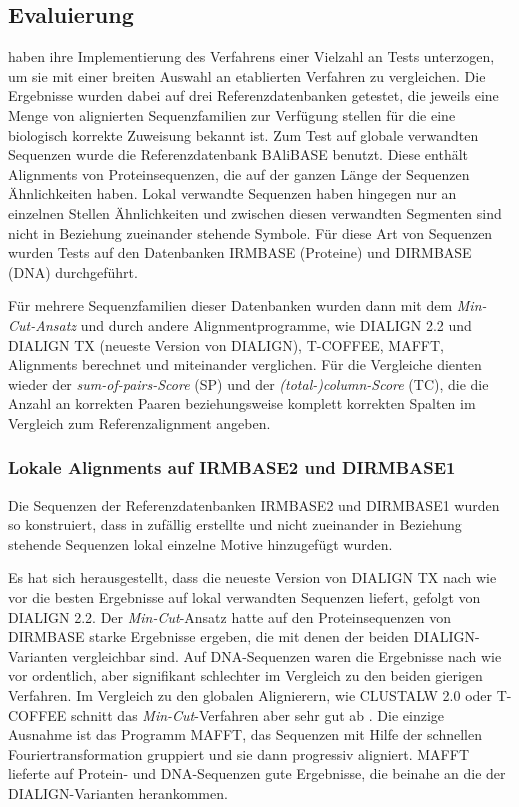 \subsection{Evaluierung}

\cite{cpm10} haben ihre Implementierung des Verfahrens einer Vielzahl an Tests unterzogen, um sie mit einer breiten Auswahl an etablierten Verfahren zu vergleichen. Die Ergebnisse wurden dabei auf drei Referenzdatenbanken getestet, die jeweils eine Menge von alignierten Sequenzfamilien zur Verfügung stellen für die eine biologisch korrekte Zuweisung bekannt ist. Zum Test auf globale verwandten Sequenzen wurde die Referenzdatenbank BAliBASE benutzt. Diese enthält Alignments von Proteinsequenzen, die auf der ganzen Länge der Sequenzen Ähnlichkeiten haben. Lokal verwandte Sequenzen haben hingegen nur an einzelnen Stellen Ähnlichkeiten und zwischen diesen verwandten Segmenten sind nicht in Beziehung zueinander stehende Symbole. Für diese Art von Sequenzen wurden Tests auf den Datenbanken IRMBASE (Proteine) und DIRMBASE (DNA) durchgeführt.

Für mehrere Sequenzfamilien dieser Datenbanken wurden dann mit dem \emph{Min-Cut-Ansatz} und durch andere Alignmentprogramme, wie DIALIGN 2.2 und DIALIGN TX (neueste Version von DIALIGN), T-COFFEE, MAFFT, Alignments berechnet und miteinander verglichen. Für die Vergleiche dienten wieder der \emph{sum-of-pairs-Score} (SP) und der \emph{(total-)column-Score} (TC), die die Anzahl an korrekten Paaren beziehungsweise komplett korrekten Spalten im Vergleich zum Referenzalignment angeben.

\subsubsection{Lokale Alignments auf IRMBASE2 und DIRMBASE1}

Die Sequenzen der Referenzdatenbanken IRMBASE2 und DIRMBASE1 wurden so konstruiert, dass in zufällig erstellte und nicht zueinander in Beziehung stehende Sequenzen lokal einzelne Motive hinzugefügt wurden.

Es hat sich herausgestellt, dass die neueste Version von DIALIGN TX nach wie vor die besten Ergebnisse auf lokal verwandten Sequenzen liefert, gefolgt von DIALIGN 2.2. Der \emph{Min-Cut}-Ansatz hatte auf den Proteinsequenzen von DIRMBASE starke Ergebnisse ergeben, die mit denen der beiden DIALIGN-Varianten vergleichbar sind. Auf DNA-Sequenzen waren die Ergebnisse nach wie vor ordentlich, aber signifikant schlechter im Vergleich zu den beiden gierigen Verfahren. Im Vergleich zu den globalen Alignierern, wie CLUSTALW 2.0 oder T-COFFEE schnitt das \emph{Min-Cut}-Verfahren aber sehr gut ab \citep{cpm10}. Die einzige Ausnahme ist das Programm MAFFT, das Sequenzen mit Hilfe der schnellen Fouriertransformation gruppiert und sie dann progressiv aligniert. MAFFT lieferte auf Protein- und DNA-Sequenzen gute Ergebnisse, die beinahe an die der DIALIGN-Varianten herankommen.

